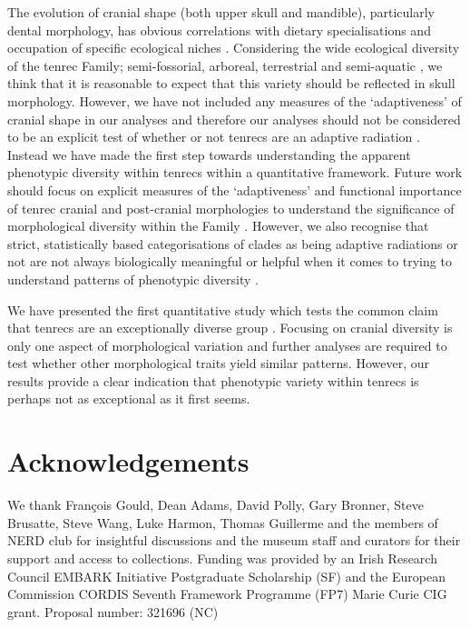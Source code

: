 \documentclass[12pt,a4paper]{article}
\begin{document}
 	The evolution of cranial shape (both upper skull and mandible), particularly dental morphology, has obvious correlations with dietary specialisations and occupation of specific ecological niches \citep[e.g.][]{Wroe2007}. Considering the wide ecological diversity of the tenrec Family; semi-fossorial, arboreal, terrestrial and semi-aquatic \citep{Soarimalala2011}, we think that it is reasonable to expect that this variety should be reflected in skull morphology. However, we have not included any measures of the `adaptiveness' of cranial shape in our analyses and therefore our analyses should not be considered to be an explicit test of whether or not tenrecs are an adaptive radiation \citep{Losos2010a}. Instead we have made the first step towards understanding the apparent phenotypic diversity within tenrecs within a quantitative framework. Future work should focus on explicit measures of the `adaptiveness' and functional importance of tenrec cranial and post-cranial morphologies to understand the significance of morphological diversity within the Family \citep[e.g.][]{Mahler2010}. However, we also recognise that strict, statistically based categorisations of clades as being adaptive radiations or not are not always biologically meaningful or helpful when it comes to trying to understand patterns of phenotypic diversity \citep{Olson2009}.   


	We have presented the first quantitative study which tests the common claim that tenrecs are an exceptionally diverse group \citep{Olson2013, Soarimalala2011,Eisenberg1969}. Focusing on cranial diversity is only one aspect of morphological variation and further analyses are required to test whether other morphological traits yield similar patterns. However, our results provide a clear indication that phenotypic variety within tenrecs is perhaps not as exceptional as it first seems.   
	
\section{Acknowledgements}

	We thank Fran\c{c}ois Gould, Dean Adams, David Polly, Gary Bronner, Steve Brusatte, Steve Wang, Luke Harmon, Thomas Guillerme and the members of NERD club for insightful discussions and the museum staff and curators for their support and access to collections. Funding was provided by an Irish Research Council EMBARK Initiative Postgraduate Scholarship (SF) and the European Commission CORDIS Seventh Framework Programme (FP7) Marie Curie CIG grant. Proposal number: 321696 (NC)





\end{document}
